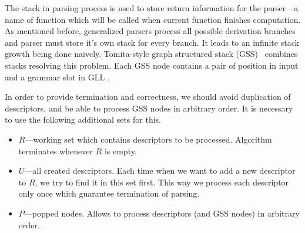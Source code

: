 The stack in parsing process is used to store return information for the parser---a name of function which will be called when current function finishes computation. 
As mentioned before, generalized parsers process all possible derivation branches and parser must store it's own stack for every branch. 
It leads to an infinite stack growth being done naively.  
Tomita-style graph structured stack (GSS)~\cite{Tomita} combines stacks resolving this problem.
Each GSS node contains a pair of position in input and a grammar slot in GLL . 

In order to provide termination and correctness, we should avoid duplication of descriptors, and be able to process GSS nodes in arbitrary order. It is necessary to use the following additional sets for this.
\begin{itemize}
\item $R$---working set which contains descriptors to be processed. Algorithm terminates whenever $R$ is empty.
\item $U$---all created descriptors. Each time when we want to add a new descriptor to $R$, we try to find it in this set first.
This way we process each descriptor only once which guarantee termination of parsing.
\item $P$---popped nodes. Allows to process descriptors (and GSS nodes) in arbitrary order. 
\end{itemize}


